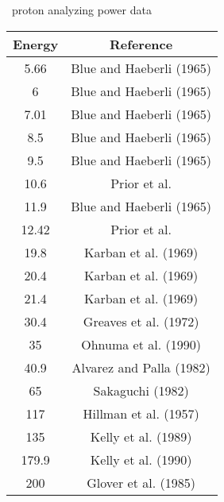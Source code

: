 \caption{\oSix\ proton analyzing power data}\begin{tabular}{|c||c|} 
    \hline 
    \bf{Energy} & \bf{Reference} \\
    \hline
    \hline 
    5.66 & Blue and Haeberli (1965) \cite{Blue1965}\\
    6 & Blue and Haeberli (1965) \cite{Blue1965}\\
    7.01 & Blue and Haeberli (1965) \cite{Blue1965}\\
    8.5 & Blue and Haeberli (1965) \cite{Blue1965}\\
    9.5 & Blue and Haeberli (1965) \cite{Blue1965}\\
    10.6 & Prior et al. \cite{Prior1971}\\
    11.9 & Blue and Haeberli (1965) \cite{Blue1965}\\
    12.42 & Prior et al. \cite{Prior1971}\\
    19.8 & Karban et al. (1969) \cite{Karban1969}\\
    20.4 & Karban et al. (1969) \cite{Karban1969}\\
    21.4 & Karban et al. (1969) \cite{Karban1969}\\
    30.4 & Greaves et al. (1972) \cite{Greaves1972}\\
    35 & Ohnuma et al. (1990) \cite{Ohnuma1990}\\
    40.9 & Alvarez and Palla (1982) \cite{Alvarez1982}\\
    65 & Sakaguchi (1982) \cite{Sakaguchi1982}\\
    117 & Hillman et al. (1957) \cite{Hillman1957}\\
    135 & Kelly et al. (1989) \cite{Kelly1989}\\
    179.9 & Kelly et al. (1990) \cite{Kelly1990}\\
    200 & Glover et al. (1985) \cite{Glover1985}\\
    \hline
\end{tabular}
